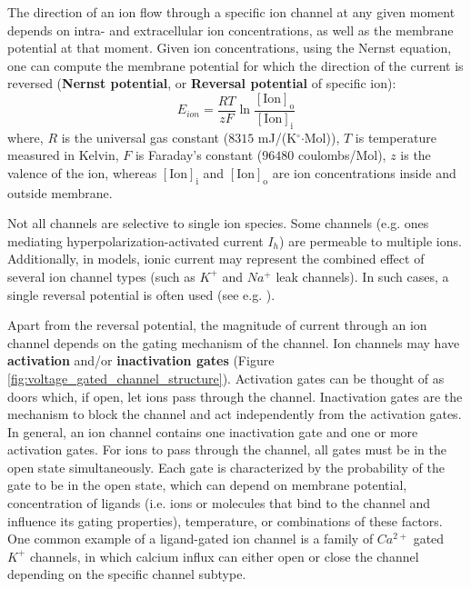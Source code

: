 \documentclass[../main.tex]{subfiles}
\begin{document}
The direction of an ion flow through a specific ion channel at any given moment depends on intra- and extracellular ion concentrations, as well as the membrane potential at that moment. Given ion concentrations, using the Nernst equation, one can compute the membrane potential for which the direction of the current is reversed \parencite{izhikevichDynamicalSystemsNeuroscience2006} (\textbf{Nernst potential}, or \textbf{Reversal potential} of specific ion):
\begin{equation}\label{eq:nernst_equation}
    E_{ion} = \frac{RT}{zF} \ln \frac{[\text{Ion}]_{\text{o}}}{[\text{Ion}]_{\text{i}}}
\end{equation}
where, $R$ is the universal gas constant ($8315$ mJ/(K$^\circ$$\cdot$Mol)), $T$ is temperature measured in Kelvin, $F$ is Faraday's constant ($96480$ coulombs/Mol), $z$ is the valence of the ion, whereas $[\text{Ion}]_{\text{i}}$ and $[\text{Ion}]_{\text{o}}$ are ion concentrations inside and outside membrane.

Not all channels are selective to single ion species. Some channels (e.g. ones mediating hyperpolarization-activated current $I_h$) are permeable to multiple ions. Additionally, in models, ionic current may represent the combined effect of several ion channel types (such as $K^+$ and $Na^+$ leak channels). In such cases, a single reversal potential is often used (see e.g. \parencite{wangMultipleDynamicalModes1994}).

Apart from the reversal potential, the magnitude of current through an ion channel depends on the gating mechanism of the channel. Ion channels may have \textbf{activation} and/or \textbf{inactivation gates} (Figure \ref{fig:voltage_gated_channel_structure}). Activation gates can be thought of as doors which, if open, let ions pass through the channel. Inactivation gates are the mechanism to block the channel and act independently from the activation gates. In general, an ion channel contains one inactivation gate and one or more activation gates. For ions to pass through the channel, all gates must be in the open state simultaneously. Each gate is characterized by the probability of the gate to be in the open state, which can depend on membrane potential, concentration of ligands (i.e. ions or molecules that bind to the channel and influence its gating properties), temperature, or combinations of these factors. One common example of a ligand-gated ion channel is a family of $Ca^{2+}$ gated $K^+$ channels, in which calcium influx can either open or close the channel depending on the specific channel subtype.
\end{document}
